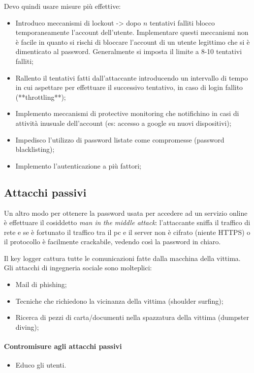 \noindent Devo quindi usare misure più effettive:
\begin{itemize}
    \item Introduco meccanismi di lockout -> dopo $n$ tentativi falliti blocco temporaneamente l'account dell'utente. Implementare questi meccanismi non è facile in quanto si rischi di bloccare l'account di un utente legittimo che si è dimenticato al password. Generalmente si imposta il limite a 8-10 tentativi falliti;
    \item Rallento il tentativi fatti dall'attaccante introducendo un intervallo di tempo in cui aspettare per effettuare il successivo tentativo, in caso di login fallito (**throttling**);
    \item Implemento meccanismi di protective monitoring che notifichino in casi di attività inusuale dell'account (es: accesso a google su nuovi dispositivi);
    \item Impedisco l'utilizzo di password listate come compromesse (password blacklisting);
    \item Implemento l'autenticazione a più fattori;
\end{itemize}

\subsection{Attacchi passivi}
Un altro modo per ottenere la password usata per accedere ad un servizio online è effettuare il cosiddetto \textit{man in the middle attack}: l'attaccante sniffa il traffico di rete e se è fortunato il traffico tra il pc e il server non è cifrato (niente HTTPS) o il protocollo è facilmente crackabile, vedendo così la password in chiaro. 

Il key logger cattura tutte le comunicazioni fatte dalla macchina della vittima.
\\

\noindent Gli attacchi di ingegneria sociale sono molteplici:
\begin{itemize}
    \item Mail di phishing;
    \item Tecniche che richiedono la vicinanza della vittima (shoulder surfing);
    \item Ricerca di pezzi di carta/documenti nella spazzatura della vittima (dumpster diving);
\end{itemize}

\paragraph{Contromisure agli attacchi passivi}
\begin{itemize}
    \item Educo gli utenti.
\end{itemize}



